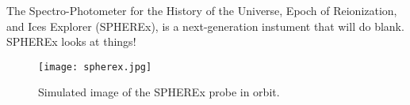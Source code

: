 The Spectro-Photometer for the History of the Universe, Epoch of Reionization, and Ices Explorer (SPHEREx),
is a next-generation instument that will do blank. SPHEREx looks at things! \cite{2014arXiv1412.4872D}

\begin{figure}[th]
	\centering
	\texttt{[image: spherex.jpg]}
	\caption[SPHEREx Instrument]{Simulated image of the SPHEREx probe in orbit.}
	\label{fig:spherex}
\end{figure}
